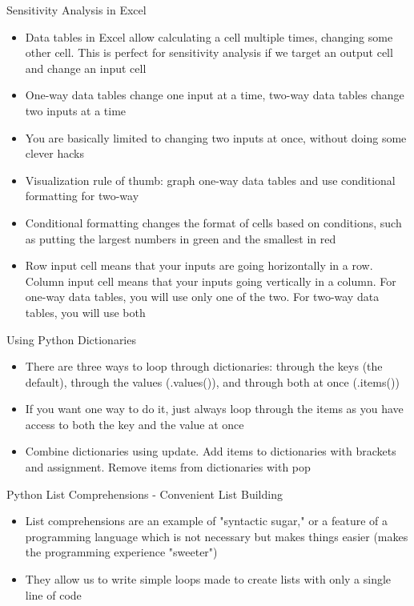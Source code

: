 \documentclass[]{article}
\begin{document}
\begin{section}{Sensitivity Analysis in Excel}
\begin{itemize}
\item Data tables in Excel allow calculating a cell multiple times, changing some other cell. This is perfect for sensitivity analysis if we target an output cell and change an input cell
\item One-way data tables change one input at a time, two-way data tables change two inputs at a time
\item You are basically limited to changing two inputs at once, without doing some clever hacks
\item Visualization rule of thumb: graph one-way data tables and use conditional formatting for two-way
\item Conditional formatting changes the format of cells based on conditions, such as putting the largest numbers in green and the smallest in red
\item Row input cell means that your inputs are going horizontally in a row. Column input cell means that your inputs going vertically in a column. For one-way data tables, you will use only one of the two. For two-way data tables, you will use both
\end{itemize}
\end{section}
\begin{section}{Using Python Dictionaries}
\begin{itemize}
\item There are three ways to loop through dictionaries: through the keys (the default), through the values (.values()), and through both at once (.items())
\item If you want one way to do it, just always loop through the items as you have access to both the key and the value at once
\item Combine dictionaries using update. Add items to dictionaries with brackets and assignment. Remove items from dictionaries with pop
\end{itemize}
\end{section}
\begin{section}{Python List Comprehensions - Convenient List Building}
\begin{itemize}
\item List comprehensions are an example of "syntactic sugar," or a feature of a programming language which is not necessary but makes things easier (makes the programming experience "sweeter")
\item They allow us to write simple loops made to create lists with only a single line of code
\end{itemize}
\end{section}
\end{document}
